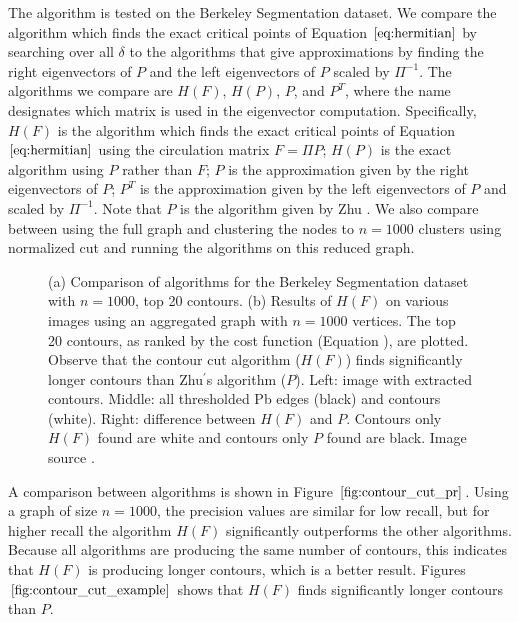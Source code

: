 \documentclass{SMBV12}
\begin{document}
The algorithm is tested on the Berkeley Segmentation dataset. We compare the algorithm which finds the exact critical points of Equation $\ref{eq:hermitian}$ by searching over all $\delta$ to the algorithms that give approximations by finding the right eigenvectors of $P$ and the left eigenvectors of $P$ scaled by $\Pi^{-1}$. The algorithms we compare are $H(F)$, $H(P)$, $P$, and $P^T$, where the name designates which matrix is used in the eigenvector computation. Specifically, $H(F)$ is the algorithm which finds the exact critical points of Equation $\ref{eq:hermitian}$ using the circulation matrix $F = \Pi P$; $H(P)$ is the exact algorithm using $P$ rather than $F$; $P$ is the approximation given by the right eigenvectors of $P$; $P^T$ is the approximation given by the left eigenvectors of $P$ and scaled by $\Pi^{-1}$. Note that $P$ is the algorithm given by Zhu \cite{zhu2007untangling}. We also compare between using the full graph and clustering the nodes to $n = 1000$ clusters using normalized cut \cite{shi2000normalized} and running the algorithms on this reduced graph.
\begin{figure}[htbp]
    \centering
    \caption{(a) Comparison of algorithms for the Berkeley Segmentation dataset with $n = 1000$, top 20 contours. (b) Results of $H(F)$ on various images using an aggregated graph with $n = 1000$ vertices. The top 20 contours, as ranked by the cost function (Equation ), are plotted. Observe that the contour cut algorithm ($H(F)$) finds significantly longer contours than Zhu$^\prime$s algorithm ($P$). Left: image with extracted contours. Middle: all thresholded Pb edges (black) and contours (white). Right: difference between $H(F)$ and $P$. Contours only $H(F)$ found are white and contours only $P$ found are black. Image source \cite{KenGalShi2011}.}
\end{figure}
A comparison between algorithms is shown in Figure $\ref{fig:contour_cut_pr}$. Using a graph of size $n = 1000$, the precision values are similar for low recall, but for higher recall the algorithm $H(F)$ significantly outperforms the other algorithms. Because all algorithms are producing the same number of contours, this indicates that $H(F)$ is producing longer contours, which is a better result. Figures $\ref{fig:contour_cut_example}$ shows that $H(F)$ finds significantly longer contours than $P$.
\end{document}
